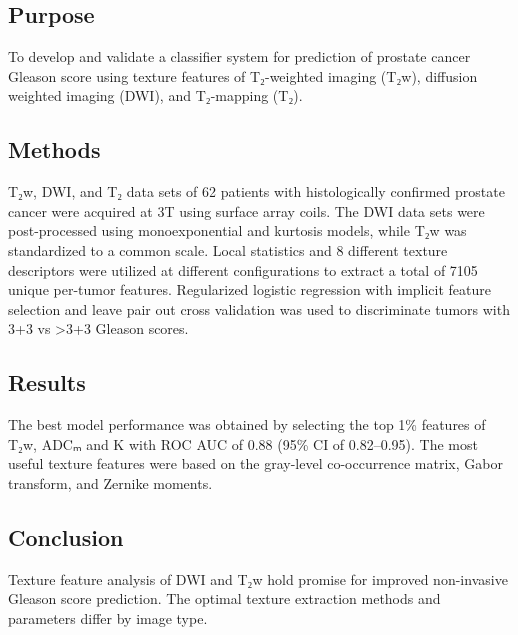 
\subsection*{Purpose}

To develop and validate a classifier system for prediction of prostate cancer
Gleason score using texture features of T₂-weighted imaging (T₂w), diffusion
weighted imaging (DWI), and T₂-mapping (T₂).


\subsection*{Methods}

T₂w, DWI, and T₂ data sets of 62 patients with histologically confirmed prostate
cancer were acquired at 3T using surface array coils. The DWI data sets were
post-processed using monoexponential and kurtosis models, while T₂w was
standardized to a common scale. Local statistics and 8 different texture
descriptors were utilized at different configurations to extract a total of
7105 unique per-tumor features. Regularized logistic regression with implicit
feature selection and leave pair out cross validation was used to discriminate
tumors with 3+3 vs >3+3 Gleason scores.


\subsection*{Results}

The best model performance was obtained by selecting the top 1\% features of
T₂w, ADCₘ and K with ROC AUC of 0.88 (95\% CI of 0.82--0.95). The most useful
texture features were based on the gray-level co-occurrence matrix, Gabor
transform, and Zernike moments.


\subsection*{Conclusion}

Texture feature analysis of DWI and T₂w hold promise for improved non-invasive
Gleason score prediction. The optimal texture extraction methods and parameters
differ by image type.
